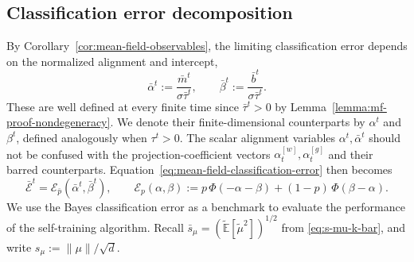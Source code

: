 \subsection{Classification error decomposition}
\label{subsec:classification-error}

By Corollary~\ref{cor:mean-field-observables}, the limiting
classification error depends on the normalized alignment
and intercept,
\[
    \bar\alpha^t
    :=
    \frac{\bar m^t}{\sigma\bar\tau^t},
    \qquad
    \bar\beta^t
    :=
    \frac{\bar b^t}{\sigma\bar\tau^t}.
\]
These are well defined at every finite time since
$\bar\tau^t>0$ by Lemma~\ref{lemma:mf-proof-nondegeneracy}.
We denote their finite-dimensional counterparts by
$\alpha^t$ and $\beta^t$, defined analogously when $\tau^t>0$.
The scalar alignment variables $\alpha^t,\bar\alpha^t$
should not be confused with the projection-coefficient
vectors $\alpha_t^{[w]},\alpha_t^{[g]}$ and their
barred counterparts.
Equation~\eqref{eq:mean-field-classification-error}
then becomes
\begin{equation}
    \bar{\mathcal E}^t
    =
    \mathcal E_{\bar p}(\bar\alpha^t,\bar\beta^t),
    \qquad
    \mathcal E_p(\alpha,\beta)
    :=
    p\,\Phi(-\alpha-\beta)
    +(1-p)\,\Phi(\beta-\alpha).
    \label{eq:normalized-classification-error}
\end{equation}
We use the Bayes classification error as a benchmark to evaluate the performance of the self-training algorithm.
Recall $\bar s_\mu=(\tilde{\mathbb E}[\tilde\mu^2])^{1/2}$
from \eqref{eq:s-mu-k-bar}, and write
$s_\mu:=\|\mu\|/\sqrt d$.

